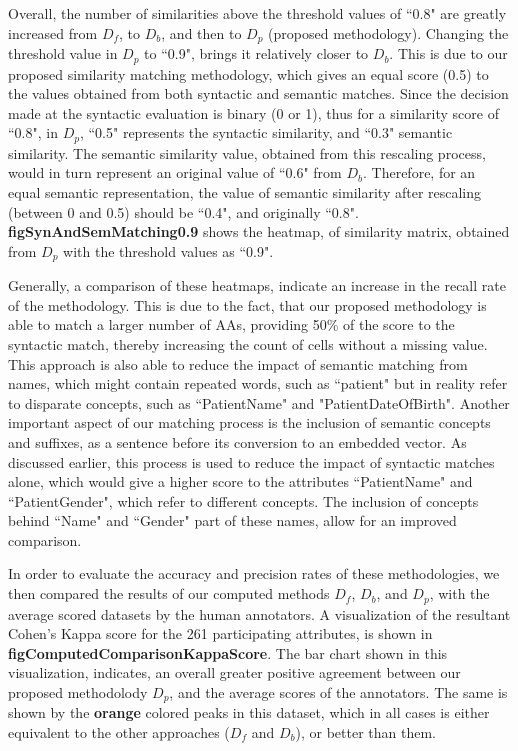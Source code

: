 Overall, the number of similarities above the threshold values of ``0.8" are greatly increased from $D_f$, to $D_b$, and then to $D_p$ (proposed methodology). Changing the threshold value in $D_p$ to ``0.9", brings it relatively closer to $D_b$. This is due to our proposed similarity matching methodology, which gives an equal score (0.5) to the values obtained from both syntactic and semantic matches. Since the decision made at the syntactic evaluation is binary (0 or 1), thus for a similarity score of ``0.8", in $D_p$, ``0.5" represents the syntactic similarity, and ``0.3" semantic similarity. The semantic similarity value, obtained from this rescaling process, would in turn represent an original value of ``0.6" from $D_b$. Therefore, for an equal semantic representation, the value of semantic similarity after rescaling (between 0 and 0.5) should be ``0.4", and originally ``0.8". \textbf{figSynAndSemMatching0.9} shows the heatmap, of similarity matrix, obtained from $D_p$ with the threshold values as ``0.9".

Generally, a comparison of these heatmaps, indicate an increase in the recall rate of the methodology. This is due to the fact, that our proposed methodology is able to match a larger number of AAs, providing 50\% of the score to the syntactic match, thereby increasing the count of cells without a missing value. This approach is also able to reduce the impact of semantic matching from names, which might contain repeated words, such as ``patient" but in reality refer to disparate concepts, such as ``PatientName" and "PatientDateOfBirth". Another important aspect of our matching process is the inclusion of semantic concepts and suffixes, as a sentence before its conversion to an embedded vector. As discussed earlier, this process is used to reduce the impact of syntactic matches alone, which would give a higher score to the attributes ``PatientName" and ``PatientGender", which refer to different concepts. The inclusion of concepts behind ``Name" and ``Gender" part of these names, allow for an improved comparison. 


In order to evaluate the accuracy and precision rates of these methodologies, we then compared the results of our computed methods $D_f$, $D_b$, and $D_p$, with the average scored datasets by the human annotators. A visualization of the resultant Cohen's Kappa score for the 261 participating attributes, is shown in \textbf{figComputedComparisonKappaScore}. The bar chart shown in this visualization, indicates, an overall greater positive agreement between our proposed methodolody $D_p$, and the average scores of the annotators. The same is shown by the \textbf{orange} colored peaks in this dataset, which in all cases is either equivalent to the other approaches ($D_f$ and $D_b$), or better than them.






